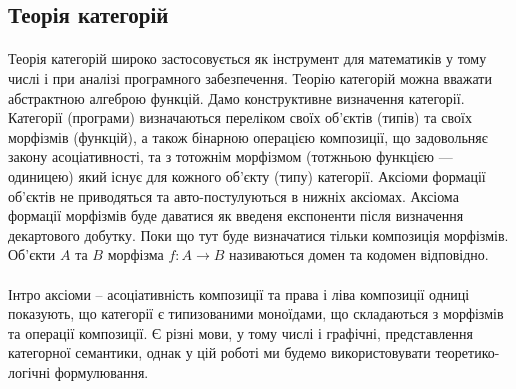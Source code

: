 \subsection{Теорія категорій}

    \paragraph{}
    Теорія категорій широко застосовується як інструмент для математиків у тому числі і
    при аналізі програмного забезпечення. Теорію категорій можна вважати абстрактною алгеброю функцій.
    Дамо конструктивне визначення категорії.
    Категорії (програми) визначаються переліком своїх об’єктів (типів) та своїх
    морфізмів (функцій), а також бінарною операцією композиції,
    що задовольняє закону асоціативності, та з тотожнім морфізмом (тотжньою функцією --- одиницею) який існує
    для кожного об’єкту (типу) категорії. Аксіоми формації об’єктів не
    приводяться та авто-постулуються в нижніх аксіомах. Аксіома формації
    морфізмів буде даватися як введеня експоненти після визначення декартового добутку.
    Поки що тут буде визначатися тільки композиція морфізмів. Об’єкти $A$ та $B$ морфізма $f: A \rightarrow B$
    називаються домен та кодомен відповідно.

    \paragraph{}
    Інтро аксіоми -- асоціативність композиції та права і ліва композиції одниці показують,
    що категорії є типизованими моноїдами, що складаються з морфізмів та операції композиції.
    Є різні мови, у тому числі і графічні, представлення категорної семантики, однак у цій роботі
    ми будемо використовувати теоретико-логічні формулювання.


